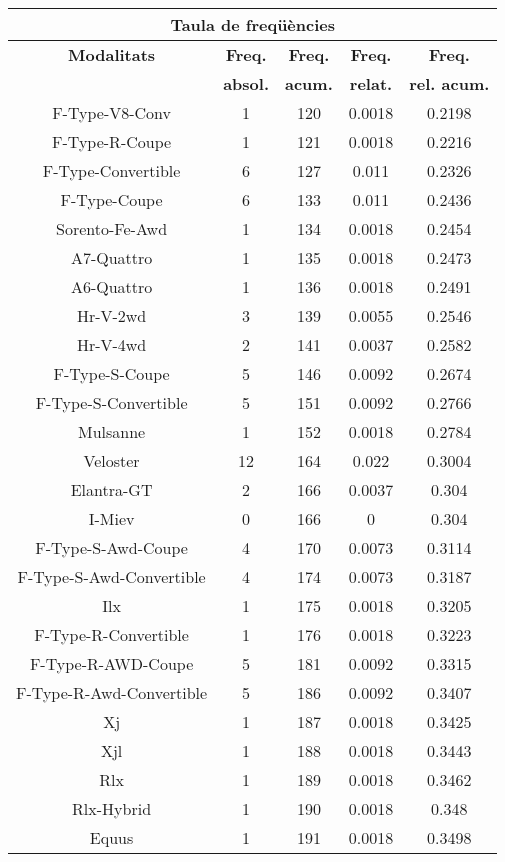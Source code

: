 \begin{center}
\begin{tabular}{|c|c|c|c|@{}c@{}|}
\hline
\multicolumn{5}{|c|}{\bf Taula de freq\" u\`encies} \\ 
\hline
{\bf Modalitats} & {\bf Freq.} & {\bf Freq.} & {\bf Freq.} & {\bf Freq.} \\ 
 & {\bf absol.} & {\bf acum.} & {\bf relat.} & {\bf rel. acum.} \\ 
\hline
\hline
F-Type-V8-Conv & 1 & 120 & 0.0018 & 0.2198 \\ 
F-Type-R-Coupe & 1 & 121 & 0.0018 & 0.2216 \\ 
F-Type-Convertible & 6 & 127 & 0.011 & 0.2326 \\ 
F-Type-Coupe & 6 & 133 & 0.011 & 0.2436 \\ 
Sorento-Fe-Awd & 1 & 134 & 0.0018 & 0.2454 \\ 
A7-Quattro & 1 & 135 & 0.0018 & 0.2473 \\ 
A6-Quattro & 1 & 136 & 0.0018 & 0.2491 \\ 
Hr-V-2wd & 3 & 139 & 0.0055 & 0.2546 \\ 
Hr-V-4wd & 2 & 141 & 0.0037 & 0.2582 \\ 
F-Type-S-Coupe & 5 & 146 & 0.0092 & 0.2674 \\ 
F-Type-S-Convertible & 5 & 151 & 0.0092 & 0.2766 \\ 
Mulsanne & 1 & 152 & 0.0018 & 0.2784 \\ 
Veloster & 12 & 164 & 0.022 & 0.3004 \\ 
Elantra-GT & 2 & 166 & 0.0037 & 0.304 \\ 
I-Miev & 0 & 166 & 0 & 0.304 \\ 
F-Type-S-Awd-Coupe & 4 & 170 & 0.0073 & 0.3114 \\ 
F-Type-S-Awd-Convertible & 4 & 174 & 0.0073 & 0.3187 \\ 
Ilx & 1 & 175 & 0.0018 & 0.3205 \\ 
F-Type-R-Convertible & 1 & 176 & 0.0018 & 0.3223 \\ 
F-Type-R-AWD-Coupe & 5 & 181 & 0.0092 & 0.3315 \\ 
F-Type-R-Awd-Convertible & 5 & 186 & 0.0092 & 0.3407 \\ 
Xj & 1 & 187 & 0.0018 & 0.3425 \\ 
Xjl & 1 & 188 & 0.0018 & 0.3443 \\ 
Rlx & 1 & 189 & 0.0018 & 0.3462 \\ 
Rlx-Hybrid & 1 & 190 & 0.0018 & 0.348 \\ 
Equus & 1 & 191 & 0.0018 & 0.3498 \\ 

\end{tabular}
\end{center}
